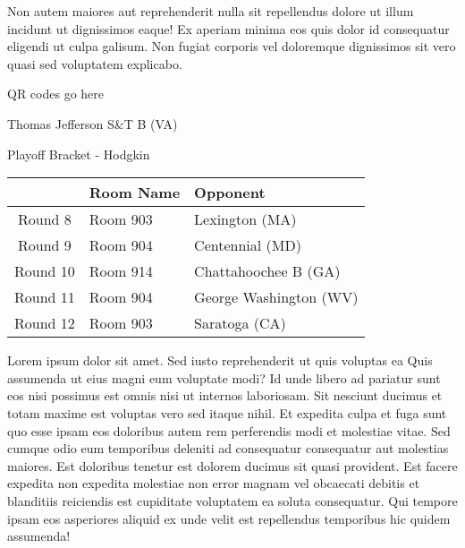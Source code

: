 \documentclass{article}%
\begin{document}
\newline%
Non autem maiores aut reprehenderit nulla sit repellendus dolore ut illum incidunt ut dignissimos eaque! Ex aperiam minima eos quis dolor id consequatur eligendi ut culpa galisum. Non fugiat corporis vel doloremque dignissimos sit vero quasi sed voluptatem explicabo.\newline%
\newline%
%
\vspace*{30pt}%
\begin{center}%
\begin{Huge}%
QR codes go here%
\end{Huge}%
\end{center}%
\newpage%
\begin{center}%
\begin{Huge}%
Thomas Jefferson S\&T B (VA)%
\end{Huge}%
\vspace*{8pt}%
\linebreak%
\begin{Large}%
Playoff Bracket {-} Hodgkin%
\end{Large}%
\end{center}%
\begin{tabularx}{\textwidth}{|c|Y|Y|}%
\hline%
&Room Name&Opponent\\%
\hline%
Round 8&Room 903&Lexington (MA)\\%
Round 9&Room 904&Centennial (MD)\\%
Round 10&Room 914&Chattahoochee B (GA)\\%
Round 11&Room 904&George Washington (WV)\\%
Round 12&Room 903&Saratoga (CA)\\%
\hline%
\end{tabularx}%
\vspace*{8pt}%
\linebreak%
\newline%
\newline%
Lorem ipsum dolor sit amet. Sed iusto reprehenderit ut quis voluptas ea Quis assumenda ut eius magni eum voluptate modi? Id unde libero ad pariatur sunt eos nisi possimus est omnis nisi ut internos laboriosam. Sit nesciunt ducimus et totam maxime est voluptas vero sed itaque nihil. Et expedita culpa et fuga sunt quo esse ipsam eos doloribus autem rem perferendis modi et molestiae vitae.\newline%
\newline%
Sed cumque odio eum temporibus deleniti ad consequatur consequatur aut molestias maiores. Est doloribus tenetur est dolorem ducimus sit quasi provident. Est facere expedita non expedita molestiae non error magnam vel obcaecati debitis et blanditiis reiciendis est cupiditate voluptatem ea soluta consequatur. Qui tempore ipsam eos asperiores aliquid ex unde velit est repellendus temporibus hic quidem assumenda!\newline%
\end{document}
